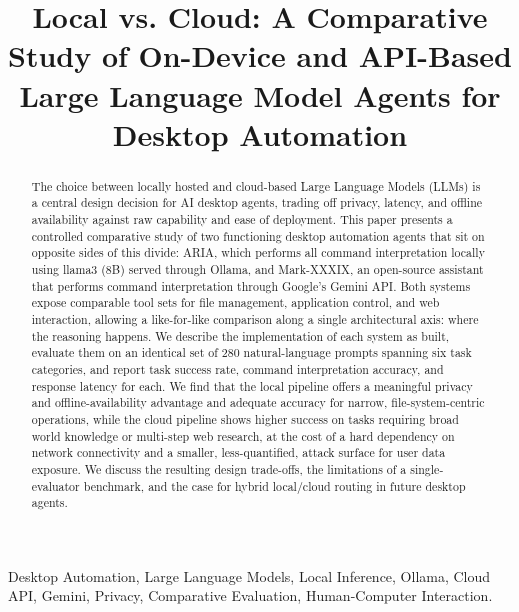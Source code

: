 \documentclass[conference]{IEEEtran}
\begin{document}
\title{Local vs. Cloud: A Comparative Study of On-Device and API-Based Large Language Model Agents for Desktop Automation}

\author{
}

\maketitle

\begin{abstract}
The choice between locally hosted and cloud-based Large Language Models (LLMs) is a central design decision for AI desktop agents, trading off privacy, latency, and offline availability against raw capability and ease of deployment. This paper presents a controlled comparative study of two functioning desktop automation agents that sit on opposite sides of this divide: ARIA, which performs all command interpretation locally using llama3 (8B) served through Ollama, and Mark-XXXIX, an open-source assistant that performs command interpretation through Google's Gemini API. Both systems expose comparable tool sets for file management, application control, and web interaction, allowing a like-for-like comparison along a single architectural axis: where the reasoning happens. We describe the implementation of each system as built, evaluate them on an identical set of 280 natural-language prompts spanning six task categories, and report task success rate, command interpretation accuracy, and response latency for each. We find that the local pipeline offers a meaningful privacy and offline-availability advantage and adequate accuracy for narrow, file-system-centric operations, while the cloud pipeline shows higher success on tasks requiring broad world knowledge or multi-step web research, at the cost of a hard dependency on network connectivity and a smaller, less-quantified, attack surface for user data exposure. We discuss the resulting design trade-offs, the limitations of a single-evaluator benchmark, and the case for hybrid local/cloud routing in future desktop agents.
\end{abstract}

\begin{IEEEkeywords}
Desktop Automation, Large Language Models, Local Inference, Ollama, Cloud API, Gemini, Privacy, Comparative Evaluation, Human-Computer Interaction.
\end{IEEEkeywords}
\end{document}
